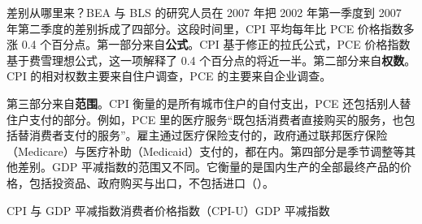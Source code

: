 差别从哪里来？BEA 与 BLS 的研究人员在 2007 年把 2002 年第一季度到 2007 年第二季度的差别拆成了四部分。这段时间里，CPI 平均每年比 PCE 价格指数多涨 0.4 个百分点\cite{mccully2007}。第一部分来自\textbf{公式}。CPI 基于修正的拉氏公式，PCE 价格指数基于费雪理想公式，这一项解释了 0.4 个百分点的将近一半。第二部分来自\textbf{权数}。CPI 的相对权数主要来自住户调查，PCE 的主要来自企业调查。

第三部分来自\textbf{范围}。CPI 衡量的是所有城市住户的自付支出，PCE 还包括别人替住户支付的部分。例如，PCE 里的医疗服务“既包括消费者直接购买的服务，也包括替消费者支付的服务”。雇主通过医疗保险支付的，政府通过联邦医疗保险（Medicare）与医疗补助（Medicaid）支付的，都在内。第四部分是季节调整等其他差别\cite{mccully2007}。GDP 平减指数的范围又不同。它衡量的是国内生产的全部最终产品的价格，包括投资品、政府购买与出口，不包括进口（）。

\begin{compare}{CPI 与 GDP 平减指数}{消费者价格指数（CPI-U）}{GDP 平减指数}
\end{compare}

